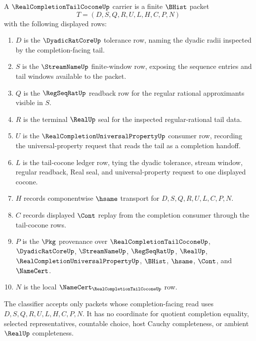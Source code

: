 \begin{definition}
\label{def:real-completion-tail-cocone-carrier}
A $\RealCompletionTailCoconeUp$ carrier is a finite $\BHist$ packet
$$
T=(D,S,Q,R,U,L,H,C,P,N)
$$
with the following displayed rows:
\begin{enumerate}
\item $D$ is the $\DyadicRatCoreUp$ tolerance row, naming the dyadic radii inspected by the completion-facing tail.
\item $S$ is the $\StreamNameUp$ finite-window row, exposing the sequence entries and tail windows available to the packet.
\item $Q$ is the $\RegSeqRatUp$ readback row for the regular rational approximants visible in $S$.
\item $R$ is the terminal $\RealUp$ seal for the inspected regular-rational tail data.
\item $U$ is the $\RealCompletionUniversalPropertyUp$ consumer row, recording the universal-property request that reads the tail as a completion handoff.
\item $L$ is the tail-cocone ledger row, tying the dyadic tolerance, stream window, regular readback, Real seal, and universal-property request to one displayed cocone.
\item $H$ records componentwise $\hsame$ transport for $D,S,Q,R,U,L,C,P,N$.
\item $C$ records displayed $\Cont$ replay from the completion consumer through the tail-cocone rows.
\item $P$ is the $\Pkg$ provenance over $\RealCompletionTailCoconeUp$, $\DyadicRatCoreUp$, $\StreamNameUp$, $\RegSeqRatUp$, $\RealUp$, $\RealCompletionUniversalPropertyUp$, $\BHist$, $\hsame$, $\Cont$, and $\NameCert$.
\item $N$ is the local $\NameCert_{\RealCompletionTailCoconeUp}$ row.
\end{enumerate}
The classifier accepts only packets whose completion-facing read uses $D,S,Q,R,U,L,H,C,P,N$. It has no coordinate for quotient completion equality, selected representatives, countable choice, host Cauchy completeness, or ambient $\RealUp$ completeness.
\end{definition}

